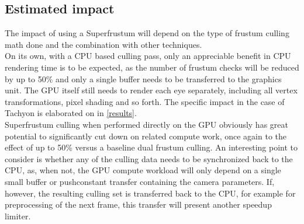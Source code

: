 \subsection{Estimated impact}
The impact of using a Superfrustum will depend on the type of frustum culling math done and the combination with other techniques. \\
On its own, with a CPU based culling pass, only an appreciable benefit in CPU rendering time is to be expected, as the number of frustum checks will be reduced by up to 50\% and only a single buffer needs to be transferred to the graphics unit. The GPU itself still needs to render each eye separately, including all vertex transformations, pixel shading and so forth. The specific impact in the case of \gls{Tachyon} is elaborated on in \autoref{results}. \\
Superfrustum culling when performed directly on the GPU obviously has great potential to significantly cut down on related compute work, once again to the effect of up to 50\% versus a baseline dual frustum culling. An interesting point to consider is whether any of the culling data needs to be synchronized back to the CPU, as, when not, the GPU compute workload will only depend on a single small buffer or pushconstant transfer containing the camera parameters. If, however, the resulting culling set is transferred back to the CPU, for example for preprocessing of the next frame, this transfer will present another speedup limiter. 

